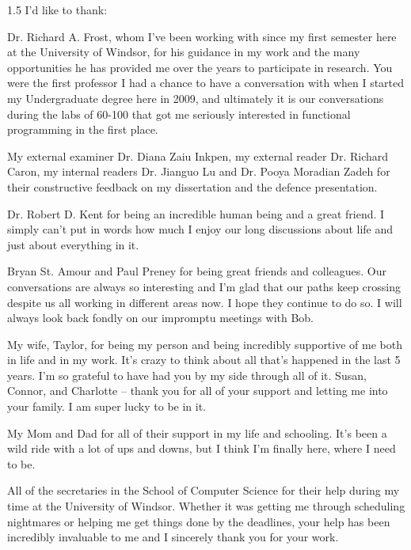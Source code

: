 \documentclass[fleqn, oneside, 12pt]{book}
\theoremstyle{definitionsty}
\newcommand{\uwinonehalfspacelen}{1.5}
\newcommand{\uwindefaultspacelen}{\uwinonehalfspacelen}
\newenvironment{uwindefaultspaceenv}%
{\begin{spacing}{\uwindefaultspacelen}}%
	{\end{spacing}}
\begin{document}
\begin{uwindefaultspaceenv}
	I'd like to thank:

	Dr. Richard A. Frost, whom I've been working with since my first semester here at the University of Windsor, for his guidance in my work
	and the many opportunities he has provided me over the years to participate in research.  You were the first professor I had a chance to have a conversation with when I started
	my Undergraduate degree here in 2009, and ultimately it is our conversations during the labs of 60-100 that got me seriously interested in functional programming in the first place.

    My external examiner Dr. Diana Zaiu Inkpen, my external reader Dr. Richard Caron,
    my internal readers Dr. Jianguo Lu and Dr. Pooya Moradian Zadeh for their constructive feedback on my dissertation and the defence presentation.

	Dr. Robert D. Kent for being an incredible human being and a great friend.  I simply can't put in words how much I enjoy our long discussions about life and just about everything in it.

    Bryan St. Amour and Paul Preney for being great friends and colleagues.  Our conversations are always so interesting and I'm glad that our paths keep crossing despite us all working in different areas now.  I hope they continue to do so.  I will always look back fondly on our impromptu meetings with Bob.

	My wife, Taylor, for being my person and being incredibly supportive of me both in life and in my work.  It's crazy to think about all that's happened in the last 5 years.  I'm so grateful to have had you by my side through all of it.  Susan, Connor, and Charlotte -- thank you for all of your support and letting me into your family.  I am super lucky to be in it.

    My Mom and Dad for all of their support in my life and schooling.  It's been a wild ride with a lot of ups and downs, but I think I'm finally here, where I need to be.

	All of the secretaries in the School of Computer Science for their help during my time at the University of Windsor.  Whether it was getting me through scheduling nightmares or helping me get things done by the deadlines, your help has been incredibly invaluable to me and I sincerely thank you for your work.

\end{uwindefaultspaceenv}
\end{document}
